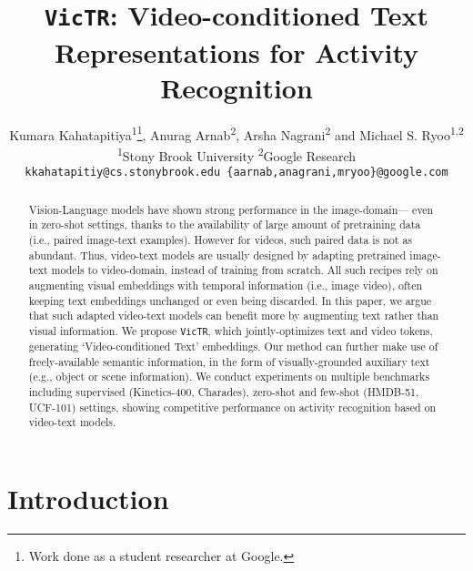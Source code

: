 \documentclass[10pt,twocolumn,letterpaper]{article}
\newcommand{\ours}{\texttt{VicTR}}
\begin{document}
\title{\ours: Video-conditioned Text Representations for Activity Recognition}

\author{Kumara Kahatapitiya\textsuperscript{1}\thanks{Work done as a student researcher at Google.}\hspace{1mm}, Anurag Arnab\textsuperscript{2}, Arsha Nagrani\textsuperscript{2} and Michael S. Ryoo\textsuperscript{1,2} \vspace{1mm}\\ 
\textsuperscript{1}Stony Brook University \hspace{2mm} \textsuperscript{2}Google Research\\
{\tt\small kkahatapitiy@cs.stonybrook.edu \{aarnab,anagrani,mryoo\}@google.com}
}

\maketitle

\begin{abstract}
   Vision-Language models have shown strong performance in the image-domain--- even in zero-shot settings, thanks to the availability of large amount of pretraining data (i.e., paired image-text examples). However for videos, such paired data is not as abundant. Thus, video-text models are usually designed by adapting pretrained image-text models to video-domain, instead of training from scratch. All such recipes rely on augmenting visual embeddings with temporal information (i.e., image  video), often keeping text embeddings unchanged or even being discarded. In this paper, we argue that such adapted video-text models can benefit more by augmenting text rather than visual information. We propose \ours, which jointly-optimizes text and video tokens, generating `Video-conditioned Text' embeddings. Our method can further make use of freely-available semantic information, in the form of visually-grounded auxiliary text (e.g., object or scene information). We conduct experiments on multiple benchmarks including supervised (Kinetics-400, Charades), zero-shot and few-shot (HMDB-51, UCF-101) settings, showing competitive performance on activity recognition based on video-text models. \end{abstract}


\section{Introduction}
\label{sec:intro}
\end{document}
